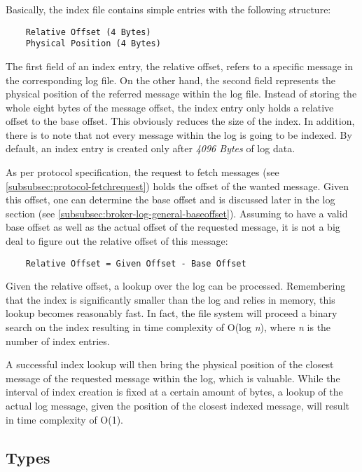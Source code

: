 Basically, the index file contains simple entries with the following
structure:

\begin{verbatim}
    Relative Offset (4 Bytes)
    Physical Position (4 Bytes)
\end{verbatim}

The first field of an index entry, the relative offset, refers to a specific
message in the corresponding log file. On the other hand, the second field
represents the physical position of the referred message within the log file.
Instead of storing the whole eight bytes of the message offset, the index entry
only holds a relative offset to the base offset. This obviously reduces the size
of the index. In addition, there is to note that not every message within the
log is going to be indexed. By default, an index entry is created only after
\textit{4096 Bytes} of log data.

As per protocol specification, the request to fetch messages (see
\ref{subsubsec:protocol-fetchrequest}) holds the offset of the wanted message.
Given this offset, one can determine the base offset and is discussed later in
the log section (see \ref{subsubsec:broker-log-general-baseoffset}).  Assuming
to have a valid base offset as well as the actual offset of the requested
message, it is not a big deal to figure out the relative offset of this message:

\begin{verbatim}
    Relative Offset = Given Offset - Base Offset
\end{verbatim}

Given the relative offset, a lookup over the log can be processed. Remembering
that the index is significantly smaller than the log and relies in memory, this
lookup becomes reasonably fast. In fact, the file system will proceed a binary
search on the index resulting in time complexity of O(log \textit{n}), where
\textit{n} is the number of index entries.

A successful index lookup will then bring the physical position of the closest
message of the requested message within the log, which is valuable. While the
interval of index creation is fixed at a certain amount of bytes, a lookup of
the actual log message, given the position of the closest indexed message, will
result in time complexity of O(1).

\subsection{Types}

